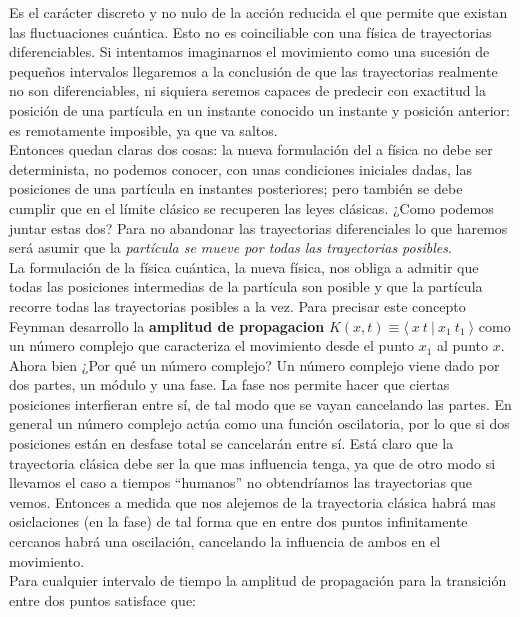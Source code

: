 \documentclass[12pt,a4paper]{article}
\numberwithin{equation}{section}
\numberwithin{figure}{section}
\begin{document}
Es el carácter discreto y no nulo de la acción reducida el que permite que existan las fluctuaciones cuántica. Esto no es coinciliable con una física de trayectorias diferenciables. Si intentamos imaginarnos el movimiento como una sucesión de pequeños intervalos llegaremos a la conclusión de que las trayectorias realmente no son diferenciables, ni siquiera seremos capaces de predecir con exactitud la posición de una partícula en un instante conocido un instante y posición anterior: es remotamente imposible, ya que va saltos. \\

Entonces quedan claras dos cosas: la nueva formulación del a física no debe ser determinista, no podemos conocer, con unas condiciones iniciales dadas, las posiciones de una partícula en instantes posteriores; pero también se debe cumplir que en el límite clásico se recuperen las leyes clásicas. ¿Como podemos juntar estas dos? Para no abandonar las trayectorias diferenciales lo que haremos será asumir que la \textit{partícula se mueve por todas las trayectorias posibles}.  \\


La formulación de la física cuántica, la nueva física, nos obliga a admitir que todas las posiciones intermedias de la partícula son posible y que la partícula recorre todas las trayectorias posibles a la vez. Para precisar este concepto Feynman desarrollo la \textbf{amplitud de propagacion} $K(x,t) \equiv \langle \ x \ t \ | \ x_1 \ t_1 \ \rangle$ como un número complejo que caracteriza el movimiento desde el punto $x_1$ al punto $x$. \\

 Ahora bien ¿Por qué un número complejo? Un número complejo viene dado por dos partes, un módulo y una fase. La fase nos permite hacer que ciertas posiciones interfieran entre sí, de tal modo que se vayan cancelando las partes. En general un número complejo actúa como una función oscilatoria, por lo que si dos posiciones están en desfase total se cancelarán entre sí. Está claro que la trayectoria clásica debe ser la que mas influencia tenga, ya que de otro modo si llevamos el caso a tiempos ``humanos'' no obtendríamos las trayectorias que vemos. Entonces a medida que nos alejemos de la trayectoria clásica habrá mas osiclaciones (en la fase) de tal forma que en entre dos puntos infinitamente cercanos habrá una oscilación, cancelando la influencia de ambos en el movimiento. \\
 
Para cualquier intervalo de tiempo la amplitud de propagación para la transición entre dos puntos satisface que: 
\end{document}
